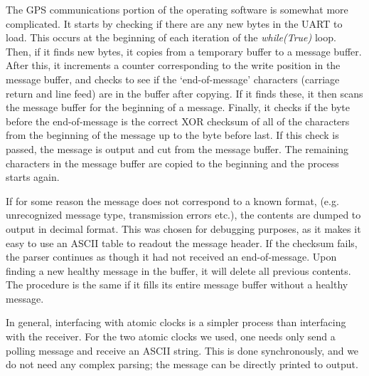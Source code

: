 The GPS communications portion of the operating software is somewhat more complicated. It starts by checking if there are any new bytes in the UART to load. This occurs at the beginning of each iteration of the \textit{while(True)} loop. Then, if it finds new bytes, it copies from a temporary buffer to a message buffer. After this, it increments a counter corresponding to the write position in the message buffer, and checks to see if the `end-of-message' characters (carriage return and line feed) are in the buffer after copying. If it finds these, it then scans the message buffer for the beginning of a message. Finally, it checks if the byte before the end-of-message is the correct XOR checksum of all of the characters from the beginning of the message up to the byte before last. If this check is passed, the message is output and cut from the message buffer. The remaining characters in the message buffer are copied to the beginning and the process starts again. 

If for some reason the message does not correspond to a known format, (e.g. unrecognized message type, transmission errors etc.), the contents are dumped to output in decimal format. This was chosen for debugging purposes, as it makes it easy to use an ASCII table to readout the message header. If the checksum fails, the parser continues as though it had not received an end-of-message. Upon finding a new healthy message in the buffer, it will delete all previous contents. The procedure is the same if it fills its entire message buffer without a healthy message. 

In general, interfacing with atomic clocks is a simpler process than interfacing with the receiver. For the two atomic clocks we used, one needs only send a polling message and receive an ASCII string. This is done synchronously, and we do not need any complex parsing; the message can be directly printed to output. 

